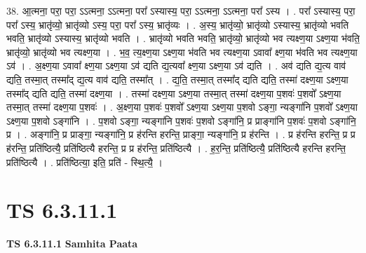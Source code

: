 \documentclass[17pt]{extarticle}
\begin{document}
38. आ॒त्मना॒ परा॒ परा॒ ऽऽत्मना॒ ऽऽत्मना॒ परा᳚ ऽस्यास्य॒ परा॒ ऽऽत्मना॒ ऽऽत्मना॒ परा᳚ ऽस्य । . परा᳚ ऽस्यास्य॒ परा॒ परा᳚ ऽस्य॒ भ्रातृ॑व्यो॒ भ्रातृ॑व्यो ऽस्य॒ परा॒ परा᳚ ऽस्य॒ भ्रातृ॑व्यः । . अ॒स्य॒ भ्रातृ॑व्यो॒ भ्रातृ॑व्यो ऽस्यास्य॒ भ्रातृ॑व्यो भवति भवति॒ भ्रातृ॑व्यो ऽस्यास्य॒ भ्रातृ॑व्यो भवति । . भ्रातृ॑व्यो भवति भवति॒ भ्रातृ॑व्यो॒ भ्रातृ॑व्यो भव त्यक्ष्ण॒या ऽक्ष्ण॒या भ॑वति॒ भ्रातृ॑व्यो॒ भ्रातृ॑व्यो भव त्यक्ष्ण॒या । . भ॒व॒ त्य॒क्ष्ण॒या ऽक्ष्ण॒या भ॑वति भव त्यक्ष्ण॒या ऽवावा᳚ क्ष्ण॒या भ॑वति भव त्यक्ष्ण॒या ऽव॑ । . अ॒क्ष्ण॒या ऽवावा᳚ क्ष्ण॒या ऽक्ष्ण॒या ऽव॑ द्यति द्य॒त्यवा᳚ क्ष्ण॒या ऽक्ष्ण॒या ऽव॑ द्यति । . अव॑ द्यति द्य॒त्य वाव॑ द्यति॒ तस्मा॒त् तस्मा᳚द् द्य॒त्य वाव॑ द्यति॒ तस्मा᳚त् । . द्य॒ति॒ तस्मा॒त् तस्मा᳚द् द्यति द्यति॒ तस्मा॑ दक्ष्ण॒या ऽक्ष्ण॒या तस्मा᳚द् द्यति द्यति॒ तस्मा॑ दक्ष्ण॒या । . तस्मा॑ दक्ष्ण॒या ऽक्ष्ण॒या तस्मा॒त् तस्मा॑ दक्ष्ण॒या प॒शवः॑ प॒शवो᳚ ऽक्ष्ण॒या तस्मा॒त् तस्मा॑ दक्ष्ण॒या प॒शवः॑ । . अ॒क्ष्ण॒या प॒शवः॑ प॒शवो᳚ ऽक्ष्ण॒या ऽक्ष्ण॒या प॒शवो ऽङ्गा॒ न्यङ्गा॑नि प॒शवो᳚ ऽक्ष्ण॒या ऽक्ष्ण॒या प॒शवो ऽङ्गा॑नि । . प॒शवो ऽङ्गा॒ न्यङ्गा॑नि प॒शवः॑ प॒शवो ऽङ्गा॑नि॒ प्र प्राङ्गा॑नि प॒शवः॑ प॒शवो ऽङ्गा॑नि॒ प्र । . अङ्गा॑नि॒ प्र प्राङ्गा॒ न्यङ्गा॑नि॒ प्र ह॑रन्ति हरन्ति॒ प्राङ्गा॒ न्यङ्गा॑नि॒ प्र ह॑रन्ति । . प्र ह॑रन्ति हरन्ति॒ प्र प्र ह॑रन्ति॒ प्रति॑ष्ठित्यै॒ प्रति॑ष्ठित्यै हरन्ति॒ प्र प्र ह॑रन्ति॒ प्रति॑ष्ठित्यै । . ह॒र॒न्ति॒ प्रति॑ष्ठित्यै॒ प्रति॑ष्ठित्यै हरन्ति हरन्ति॒ प्रति॑ष्ठित्यै । . प्रति॑ष्ठित्या॒ इति॒ प्रति॑ - स्थि॒त्यै॒ । \newline
\pagebreak
{}

\section{ TS 6.3.11.1 }

\textbf{TS 6.3.11.1 } \newline
\textbf{Samhita Paata} \newline
\end{document}
